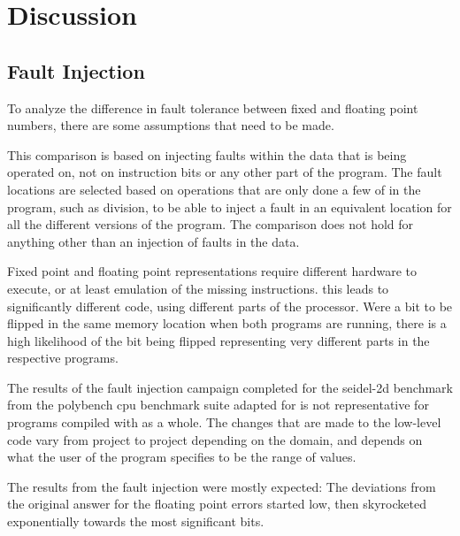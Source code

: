 \section{Discussion}

\subsection{Fault Injection}

To analyze the difference in fault tolerance between fixed and floating point numbers, there are some assumptions that need to be made. 

This comparison is based on injecting faults within the data that is being operated on, not on instruction bits or any other part of the program. The fault locations are selected based on operations that are only done a few of in the program, such as division, to be able to inject a fault in an equivalent location for all the different versions of the program. The comparison does not hold for anything other than an injection of faults in the data. 

Fixed point and floating point representations require different hardware to execute, or at least emulation of the missing instructions. this leads to significantly different code, using different parts of the processor. Were a bit to be flipped in the same memory location when both programs are running, there is a high likelihood of the bit being flipped representing very different parts in the respective programs. 




The results of the fault injection campaign completed for the seidel-2d benchmark from the polybench cpu benchmark suite adapted for \taffo is not representative for programs compiled with \taffo as a whole. The changes that are made to the low-level code vary from project to project depending on the domain, and depends on what the user of the program specifies to be the range of values. 

The results from the fault injection were mostly expected: The deviations from the original answer for the floating point errors started low, then skyrocketed exponentially towards the most significant bits.






